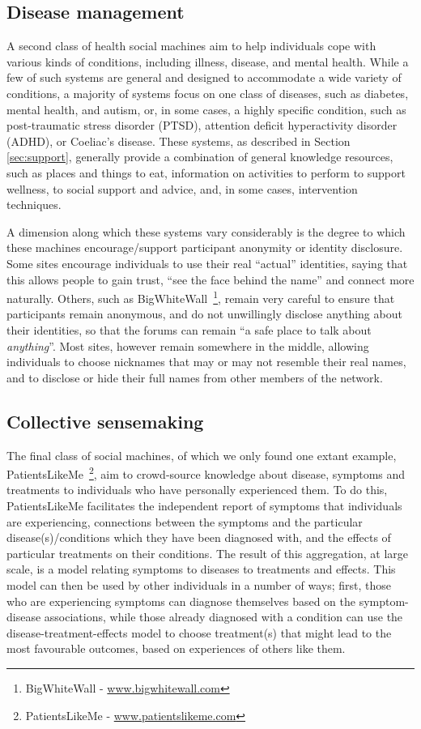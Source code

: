 \documentclass{sig-alternate}
\begin{document}
\subsection{Disease management}

A second class of health social machines aim to help individuals cope
with various kinds of conditions, including illness, disease, and
mental health.  While a few of such systems are general and designed
to accommodate a wide variety of conditions, a majority of systems
focus on one class of diseases, such as diabetes, mental health, and
autism, or, in some cases, a highly specific condition, such as
post-traumatic stress disorder (PTSD), attention deficit hyperactivity
disorder (ADHD), or Coeliac's disease.  These systems, as described in
Section \ref{sec:support}, generally provide a combination of
general knowledge resources, such as places and things to eat,
information on activities to perform to support wellness, to social
support and advice, and, in some cases, intervention techniques.

A dimension along which these systems vary considerably is the degree
to which these machines encourage/support participant anonymity or
identity disclosure.  Some sites encourage individuals to use their
real ``actual'' identities, saying that this allows people to gain
trust, ``see the face behind the name'' and connect more naturally.
Others, such as BigWhiteWall~\footnote{BigWhiteWall - \url{www.bigwhitewall.com}}, remain very careful to ensure that
participants remain anonymous, and do not unwillingly disclose
anything about their identities, so that the forums can remain ``a
safe place to talk about \emph{anything}''.  Most sites, however
remain somewhere in the middle, allowing individuals to choose
nicknames that may or may not resemble their real names, and to
disclose or hide their full names from other members of the network.

\subsection{Collective sensemaking}
The final class of social machines, of which we only found one extant
example, PatientsLikeMe~\footnote{PatientsLikeMe -
  \url{www.patientslikeme.com}}, aim to crowd-source knowledge about
disease, symptoms and treatments to individuals who have personally
experienced them.  To do this, PatientsLikeMe facilitates the
independent report of symptoms that individuals are experiencing,
connections between the symptoms and the particular
disease(s)/conditions which they have been diagnosed with, and the
effects of particular treatments on their conditions.  The result of
this aggregation, at large scale, is a model relating symptoms to
diseases to treatments and effects.  This model can then be used by
other individuals in a number of ways; first, those who are
experiencing symptoms can diagnose themselves based on the
symptom-disease associations, while those already diagnosed with
a condition can use the disease-treatment-effects model to choose
treatment(s) that might lead to the most favourable outcomes, based on experiences of
others like them.
\end{document}
